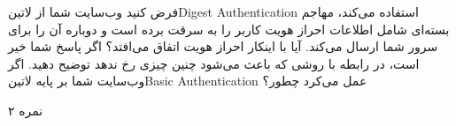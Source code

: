 \documentclass[../main.tex]{subfiles}
\begin{document}

فرض کنید وب‌سایت شما از ‌لاتین{Digest Authentication} استفاده می‌کند، مهاجم بسته‌ای شامل اطلاعات احراز هویت کاربر را به سرقت برده است و دوباره آن را برای سرور شما ارسال می‌کند. آیا با اینکار احراز هویت اتفاق می‌افتد؟
اگر پاسخ شما خیر است، در رابطه با روشی که باعث می‌شود چنین چیزی رخ ندهد توضیح دهید.
اگر وب‌سایت شما بر پایه ‌لاتین{Basic Authentication} عمل می‌کرد چطور؟

۲ نمره
\end{document}
